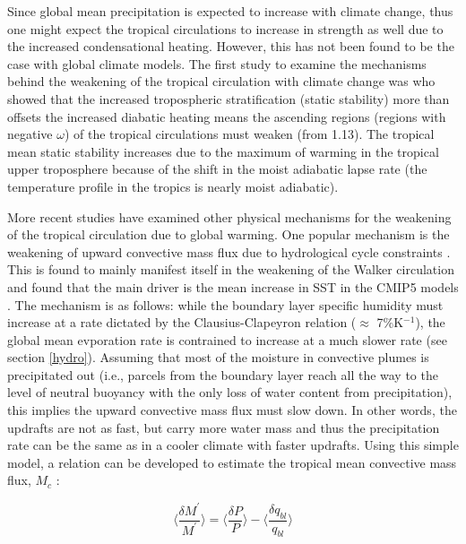 \documentclass[letterpaper,12pt,titlepage,oneside,final]{book}
\begin{document}
Since global mean precipitation is expected to increase with climate change, thus one might expect the tropical circulations to increase in strength as well due to the increased condensational heating. However, this has not been found to be the case with global climate models. The first study to examine the mechanisms behind the weakening of the tropical circulation with climate change was \citep{knutson_time-mean_1995} who showed that the increased tropospheric stratification (static stability) more than offsets the increased diabatic heating means the ascending regions (regions with negative $\omega$) of the tropical circulations must weaken (from 1.13). The tropical mean static stability increases due to the maximum of warming in the tropical upper troposphere because of the shift in the moist adiabatic lapse rate (the temperature profile in the tropics is nearly moist adiabatic).

More recent studies have examined other physical mechanisms for the weakening of the tropical circulation due to global warming. One popular mechanism is the weakening of upward convective mass flux due to hydrological cycle constraints \citep{held_robust_2006,vecchi_global_2007,chadwick_spatial_2012}. This is found to mainly manifest itself in the weakening of the Walker circulation \citep{held_robust_2006,vecchi_global_2007} and \citep{he_anthropogenic_2015} found that the main driver is the mean increase in SST in the CMIP5 models \citep{taylor_overview_2011}. The mechanism is as follows: while the boundary layer specific humidity must increase at a rate dictated by the Clausius-Clapeyron relation ($\approx$ 7\%K$^{-1}$), the global mean evporation rate is contrained to increase at a much slower rate (see section \ref{hydro}). Assuming that most of the moisture in convective plumes is precipitated out (i.e., parcels from the boundary layer reach all the way to the level of neutral buoyancy with the only loss of water content from precipitation), this implies the upward convective mass flux must slow down. In other words, the updrafts are not as fast, but carry more water mass and thus the precipitation rate can be the same as in a cooler climate with faster updrafts. Using this simple model, a relation can be developed to estimate the tropical mean convective mass flux, 
$M_{c}$ \citep{held_robust_2006}:

\begin{equation}\label{eq:HS}
\Bigg\langle\frac{\delta{M^{'}}}{M^{'}}\Bigg\rangle=\Bigg\langle\frac{\delta{P}}{P}\Bigg\rangle-\Bigg\langle\frac{\delta{q_{bl}}}{q_{bl}}\Bigg\rangle
\end{equation}
\end{document}
